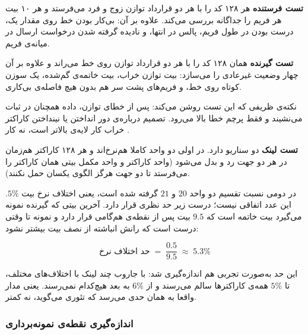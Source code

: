 \documentclass[10pt,a4paper]{article}
\begin{document}
\textbf{تست فرستنده} هر ۱۲۸ کد  را با هر دو قرارداد توازن زوج و فرد می‌فرستد و هر ۱۰ بیت هر فریم را جداگانه بررسی می‌کند. علاوه بر آن: بی‌کار بودن خط روی مقدار یک، درست بودن  در طول فریم، پالس  در انتها، و نادیده گرفته شدن درخواست ارسال در میانه‌ی فریم.

\begin{latin}

\end{latin}

\textbf{تست گیرنده} همان ۱۲۸ کد را با هر دو قرارداد توازن روی خط می‌راند و علاوه بر آن چهار وضعیت غیرعادی را می‌سازد: بیت توازن خراب، بیت خاتمه‌ی گم‌شده، یک سوزن کوتاه روی خط، و فریم‌های پشت سر هم بدون هیچ فاصله‌ی بی‌کاری.

نکته‌ی ظریفی که این تست روشن می‌کند: پس از خطای توازن، داده {همچنان} در ثبات می‌نشیند و فقط پرچم خطا بالا می‌رود. تصمیم درباره‌ی دور انداختن یا نینداختن کاراکتر خراب کار لایه‌ی بالاتر است، نه کار .

\begin{latin}

\end{latin}

\textbf{تست لینک} دو سناریو دارد. در اولی دو واحد کاملا هم‌نرخ‌اند و هر ۱۲۸ کاراکتر {هم‌زمان در هر دو جهت} رد و بدل می‌شود (واحد  کاراکتر و واحد  مکمل بیتی همان کاراکتر را می‌فرستد تا دو جهت هرگز الگوی یکسان حمل نکنند).

در دومی نسبت تقسیم دو واحد $20$ و $21$ گرفته شده است، یعنی اختلاف نرخ بیت $5\%$. این عدد اتفاقی نیست؛ درست زیر حد نظری قرار دارد. آخرین بیتی که گیرنده نمونه می‌گیرد بیت خاتمه است که $9.5$ بیت پس از نقطه‌ی هم‌گامی قرار دارد و نمونه تا وقتی درست است که رانش انباشته از نصف بیت بیشتر نشود:

\[
\text{حد اختلاف نرخ} \;=\; \frac{0.5}{9.5} \;\approx\; 5.3\%
\]

این حد به‌صورت تجربی هم اندازه‌گیری شد: با جاروب چند لینک با اختلاف‌های مختلف، تا $5\%$ همه‌ی کاراکترها سالم می‌رسند و از $6\%$ به بعد هیچ‌کدام نمی‌رسند. یعنی مدار واقعا به همان حدی می‌رسد که تئوری می‌گوید، نه کمتر.

\begin{latin}

\end{latin}

\subsubsection*{اندازه‌گیری نقطه‌ی نمونه‌برداری}
\end{document}
